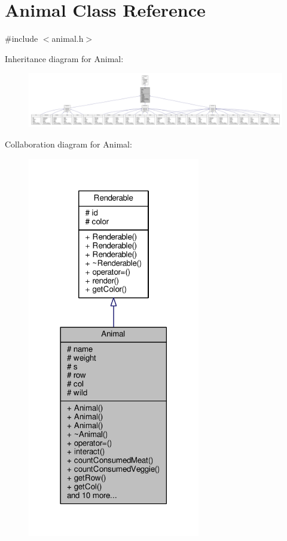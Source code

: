 \hypertarget{classAnimal}{}\section{Animal Class Reference}
\label{classAnimal}


{\ttfamily \#include $<$animal.\+h$>$}



Inheritance diagram for Animal\+:
\nopagebreak
\begin{figure}[H]
\begin{center}
\leavevmode
\includegraphics[width=350pt]{classAnimal__inherit__graph}
\end{center}
\end{figure}


Collaboration diagram for Animal\+:
\nopagebreak
\begin{figure}[H]
\begin{center}
\leavevmode
\includegraphics[width=213pt]{classAnimal__coll__graph}
\end{center}
\end{figure}
